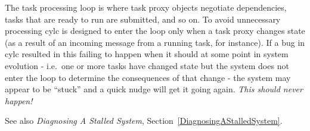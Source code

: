 The task processing loop is where task proxy objects negotiate
dependencies, tasks that are ready to run are submitted, and so on. To
avoid unnecessary processing cylc is designed to enter the loop only
when a task proxy changes state (as a result of an incoming message from
a running task, for instance).  If a bug in cylc resulted in this failing
to happen when it should at some point in system evolution - i.e.\ one
or more tasks have changed state but the system does not enter the loop
to determine the consequences of that change - the system may appear to
be ``stuck'' and a quick nudge will get it going again.  {\em This should
never happen!}

See also {\em Diagnosing A Stalled System},
Section~\ref{DiagnosingAStalledSystem}.


